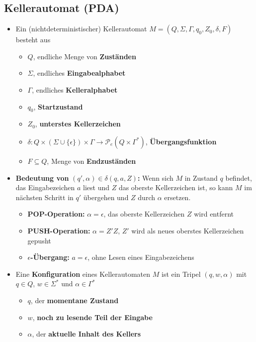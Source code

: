 \documentclass[ieeetran]{article}
\begin{document}
\subsection{Kellerautomat (PDA)} %
\label{sub:kellerautomat_pDA_}
\begin{itemize}
	\item Ein (nichtdeterministischer) Kellerautomat $M = (Q, \Sigma, \Gamma, q_0, Z_0, \delta, F)$ besteht aus
\begin{itemize}
  \item $Q$, endliche Menge von \textbf{Zuständen}
\item $\Sigma$, endliches \textbf{Eingabealphabet}
\item $\Gamma$, endliches \textbf{Kelleralphabet}
\item $q_0$, \textbf{Startzustand}
\item $Z_0$, \textbf{unterstes Kellerzeichen}
\item $\delta: Q \times (\Sigma \cup \{\epsilon\}) \times \Gamma \rightarrow \mathcal{P}_e(Q \times \Gamma^*)$, \textbf{Übergangsfunktion}
\item $F \subseteq Q$, Menge von \textbf{Endzuständen}
\end{itemize}

\item \textbf{Bedeutung von }$(q', \alpha) \in \delta(q, a, Z)$\textbf{:} Wenn sich $M$ in Zustand $q$ befindet, das Eingabezeichen $a$ liest und $Z$ das oberste Kellerzeichen ist, so kann $M$ im nächsten Schritt in $q'$ übergehen und $Z$ durch $\alpha$ ersetzen.
	\begin{itemize}
	  \item \textbf{POP-Operation:} $\alpha = \epsilon$, das oberste Kellerzeichen $Z$ wird entfernt
	\item \textbf{PUSH-Operation:} $\alpha = Z'Z$, $Z'$ wird als neues oberstes Kellerzeichen gepusht
	\item \textbf{$\epsilon$-Übergang:} $a = \epsilon$, ohne Lesen eines Eingabezeichens
	\end{itemize}

\item Eine \textbf{Konfiguration} eines Kellerautomaten $M$ ist ein Tripel $(q, w, \alpha)$ mit $q \in Q$, $w \in \Sigma^*$ und $\alpha \in \Gamma^*$
	\begin{itemize}
	  \item $q$, der \textbf{momentane Zustand}
	\item $w$, \textbf{noch zu lesende Teil der Eingabe}
	\item $\alpha$, der \textbf{aktuelle Inhalt des Kellers}
	\end{itemize}


\end{itemize}
\end{document}
